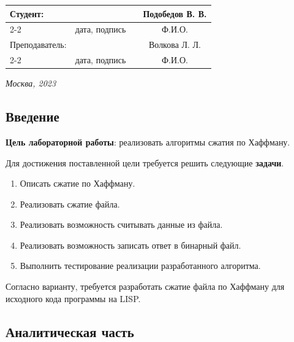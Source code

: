 \documentclass[12pt, a4paper]{article}
\begin{document}
\begin{titlepage}
  \fontsize{14}{21}\selectfont
  \vspace{5cm}


  \noindent\begin{tabularx}{\textwidth}{ X >{\centering}p{4cm} p{1cm} c }
   Студент: & & & Подобедов В. В. \\ \cline{2-2} \cline{4-4}
   & \fontsize{10}{15}\selectfont дата, подпись & & \fontsize{10}{15}\selectfont Ф.И.О. \\
   Преподаватель: & & & Волкова Л. Л.\\ \cline{2-2} \cline{4-4}
   & \fontsize{10}{15}\selectfont дата, подпись & & \fontsize{10}{15}\selectfont Ф.И.О.
  \end{tabularx}

  \vspace{\fill}

  \begin{center}
   \it{Москва}, 2023
  \end{center}

  \thispagestyle{empty}
\end{titlepage}

\renewcommand{\contentsname}{Содержание}
\setcounter{page}{2}
\tableofcontents

\newpage
\begin{center}
   \section*{Введение} 
\end{center}
\justifying
\textbf{Цель лабораторной работы}: реализовать алгоритмы сжатия по Хаффману.

Для достижения поставленной цели требуется решить следующие \textbf{задачи}.
\begin{enumerate}
\item Описать сжатие по Хаффману.
\item Реализовать сжатие файла.
\item Реализовать возможность считывать данные из файла.
\item Реализовать возможность записать ответ в бинарный файл.
\item Выполнить тестирование реализации разработанного алгоритма.
\end{enumerate}

Согласно варианту, требуется разработать сжатие файла по Хаффману для исходного кода программы на LISP.

\newpage
\begin{center}
   \section{Аналитическая часть} 
\end{center}
\end{document}
